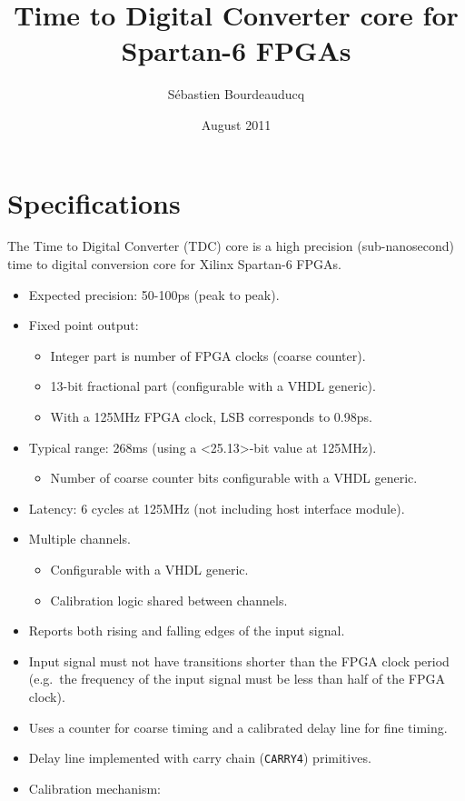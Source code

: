 \documentclass[a4paper,11pt]{article}
\title{Time to Digital Converter core for Spartan-6 FPGAs}
\author{S\'ebastien Bourdeauducq}
\date{August 2011}
\begin{document}
\setlength{\parindent}{0pt}
\setlength{\parskip}{5pt}
\maketitle{}
\section{Specifications}
The Time to Digital Converter (TDC) core is a high precision (sub-nanosecond) time to digital conversion core for Xilinx Spartan-6 FPGAs.

\begin{itemize}
\item Expected precision: 50-100ps (peak to peak).
\item Fixed point output:
\begin{itemize}
\item Integer part is number of FPGA clocks (coarse counter).
\item 13-bit fractional part (configurable with a VHDL generic).
\item With a 125MHz FPGA clock, LSB corresponds to 0.98ps.
\end{itemize}
\item Typical range: 268ms (using a <25.13>-bit value at 125MHz).
\begin{itemize}
\item Number of coarse counter bits configurable with a VHDL generic.
\end{itemize}
\item Latency: 6 cycles at 125MHz (not including host interface module).
\item Multiple channels.
\begin{itemize}
\item Configurable with a VHDL generic.
\item Calibration logic shared between channels.
\end{itemize}
\item Reports both rising and falling edges of the input signal.
\item Input signal must not have transitions shorter than the FPGA clock period (e.g.\ the frequency of the input signal must be less than half of the FPGA clock).
\item Uses a counter for coarse timing and a calibrated delay line for fine timing.
\item Delay line implemented with carry chain (\verb!CARRY4!) primitives.
\item Calibration mechanism:

\end{itemize}
\end{document}
